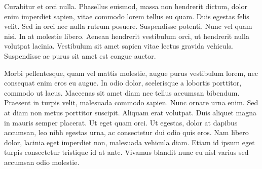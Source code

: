 Curabitur et orci nulla. Phasellus euismod, massa non hendrerit dictum,
dolor enim imperdiet sapien, vitae commodo lorem tellus eu quam. Duis
egestas felis velit. Sed in orci nec nulla rutrum posuere. Suspendisse
potenti. Nunc vel quam nisi. In at molestie libero. Aenean hendrerit
vestibulum orci, ut hendrerit nulla volutpat lacinia. Vestibulum sit amet
sapien vitae lectus gravida vehicula. Suspendisse ac purus sit amet est
congue auctor.

Morbi pellentesque, quam vel mattis molestie, augue purus vestibulum
lorem, nec consequat enim eros eu augue. In odio dolor, scelerisque
a lobortis porttitor, commodo ut lacus. Maecenas sit amet diam
nec tellus accumsan bibendum. Praesent in turpis velit, malesuada
commodo sapien. Nunc ornare urna enim. Sed at diam non metus porttitor
suscipit. Aliquam erat volutpat. Duis aliquet magna in mauris semper
placerat. Ut eget quam orci. Ut egestas, dolor at dapibus accumsan, leo
nibh egestas urna, ac consectetur dui odio quis eros. Nam libero dolor,
lacinia eget imperdiet non, malesuada vehicula diam. Etiam id ipsum eget
turpis consectetur tristique id at ante. Vivamus blandit nunc eu nisl
varius sed accumsan odio molestie.

